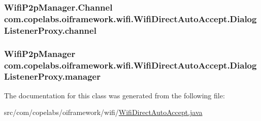 \subsubsection[{channel}]{\setlength{\rightskip}{0pt plus 5cm}Wifi\+P2p\+Manager.\+Channel com.\+copelabs.\+oiframework.\+wifi.\+Wifi\+Direct\+Auto\+Accept.\+Dialog\+Listener\+Proxy.\+channel\hspace{0.3cm}{\ttfamily [private]}}\label{classcom_1_1copelabs_1_1oiframework_1_1wifi_1_1_wifi_direct_auto_accept_1_1_dialog_listener_proxy_a20e98b87930dd1bba828a59ec1b3376b}
\hypertarget{classcom_1_1copelabs_1_1oiframework_1_1wifi_1_1_wifi_direct_auto_accept_1_1_dialog_listener_proxy_a70f3dc9b27585593ce80db3ebcdec5a7}{}
\subsubsection[{manager}]{\setlength{\rightskip}{0pt plus 5cm}Wifi\+P2p\+Manager com.\+copelabs.\+oiframework.\+wifi.\+Wifi\+Direct\+Auto\+Accept.\+Dialog\+Listener\+Proxy.\+manager\hspace{0.3cm}{\ttfamily [private]}}\label{classcom_1_1copelabs_1_1oiframework_1_1wifi_1_1_wifi_direct_auto_accept_1_1_dialog_listener_proxy_a70f3dc9b27585593ce80db3ebcdec5a7}


The documentation for this class was generated from the following file\+:\begin{DoxyCompactItemize}
\item 
src/com/copelabs/oiframework/wifi/\hyperlink{_wifi_direct_auto_accept_8java}{Wifi\+Direct\+Auto\+Accept.\+java}\end{DoxyCompactItemize}
